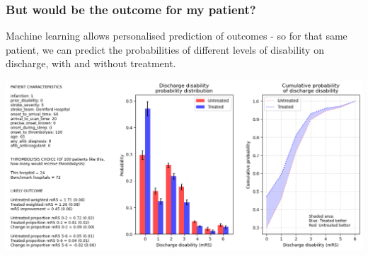 \begin{frame}
\frametitle{But would be the outcome for my patient?}

Machine learning allows personalised prediction of outcomes - so for that same patient, we can predict the probabilities of different levels of disability on discharge, with and without treatment.

\vspace{5mm}

\begin{center}
\includegraphics[width=1.0\textwidth]{./images_outcome/outcome_patient_plymouth}
\end{center}


\end{frame}